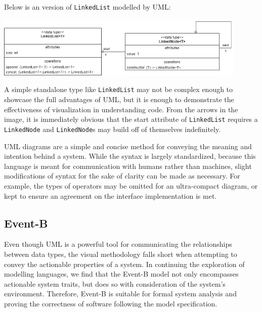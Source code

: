 \documentclass{article}
\begin{document}
Below is an version of \texttt{LinkedList} modelled by UML:
\begin{center}
    \includegraphics[width=12cm]{linked_list/uml.drawio.png}
\end{center}

A simple standalone type like \texttt{LinkedList} may not be complex enough to showcase the full advantages of UML,
but it is enough to demonstrate the effectiveness of visualization in understanding code.
From the arrows in the image, it is immediately obvious that the start attribute of
\texttt{LinkedList} requires a \texttt{LinkedNode} and \texttt{LinkedNode}s may build off of themselves indefinitely.

UML diagrams are a simple and concise method for conveying the meaning and intention behind a system.
While the syntax is largely standardized, because this language is meant for communication with humans
rather than machines, slight modifications of syntax for the sake of clarity can be made as necessary.
For example, the types of operators may be omitted for an ultra-compact diagram, or kept to ensure an agreement
on the interface implementation is met.

\subsection{Event-B}

Even though UML is a powerful tool for communicating the relationships between data types, the visual methodology
falls short when attempting to convey the actionable properties of a system. In continuing the exploration
of modelling languages, we find that the Event-B model not only encompasses actionable system traits, but does
so with consideration of the system's environment. Therefore, Event-B is suitable for formal system analysis
and proving the correctness of software following the model specification.
\end{document}
